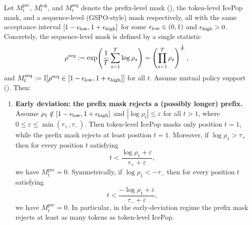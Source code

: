 \begin{theorem}
\label{thm:prefix-tighter}
Let $M^{\mathrm{pre}}_t$, $M^{\mathrm{tok}}_t$, and $M^{\mathrm{seq}}_t$ denote the prefix-level mask
(), the token-level IcePop mask, and a sequence-level (GSPO-style) mask respectively, all with the same
acceptance interval $[1-\epsilon_{\mathrm{low}}, 1+\epsilon_{\mathrm{high}}]$ for some $\epsilon_{\mathrm{low}}\in(0,1)$ and $\epsilon_{\mathrm{high}}>0$.
Concretely, the sequence-level mask is defined by a single statistic
\begin{equation*}
    \rho^{\mathrm{seq}}
    := \exp\!\left(\frac{1}{T}\sum_{s=1}^{T}\log\rho_s\right)
    = \left(\prod_{s=1}^{T}\rho_s\right)^{\frac{1}{T}},
\end{equation*}
and $M_t^{\mathrm{seq}} := \mathbb{I}[\rho^{\mathrm{seq}} \in [1-\epsilon_{\mathrm{low}},1+\epsilon_{\mathrm{high}}]]$ for all $t$.
Assume mutual policy support (). Then:

\begin{enumerate}
    \item[(a)] \textbf{Early deviation: the prefix mask rejects a (possibly longer) prefix.} Assume $\rho_1 \notin [1-\epsilon_{\mathrm{low}},1+\epsilon_{\mathrm{high}}]$ and
    $|\log\rho_t| \le \varepsilon$ for all $t>1$, where $0 \le \varepsilon \le \min(\tau_+,\tau_-)$. Then token-level IcePop masks
    only position $t=1$, while the prefix mask rejects at least position $t=1$. Moreover, if $\log\rho_1>\tau_+$ then for every position $t$
    satisfying
    \begin{equation}
        t < \frac{\log\rho_1+\varepsilon}{\tau_+ + \varepsilon},
        \label{eq:early-upper-sufficient}
    \end{equation}
    we have $M_t^{\mathrm{pre}}=0$. Symmetrically, if $\log\rho_1<-\tau_-$ then for every position $t$ satisfying
    \begin{equation}
        t < \frac{-\log\rho_1+\varepsilon}{\tau_- + \varepsilon},
        \label{eq:early-lower-sufficient}
    \end{equation}
    we have $M_t^{\mathrm{pre}}=0$. In particular, in the early-deviation regime the prefix mask rejects at least as many tokens as
    token-level IcePop.


\end{enumerate}
\end{theorem}
